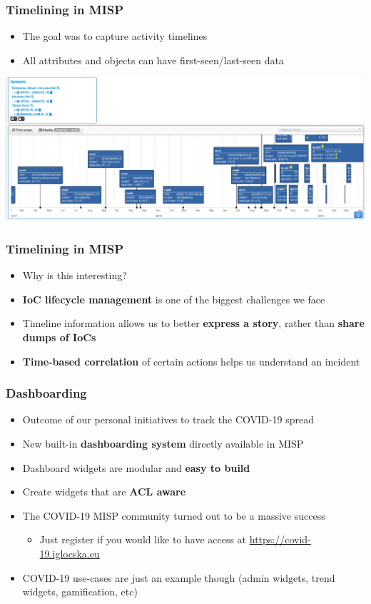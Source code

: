 \begin{frame}
\frametitle{Timelining in MISP}
\begin{itemize}
	\item The goal was to capture activity timelines
        \item All attributes and objects can have first-seen/last-seen data       
\end{itemize}
\includegraphics[scale=0.25]{images/timeline.png}
\end{frame}

\begin{frame}
\frametitle{Timelining in MISP}
\begin{itemize}
	\item Why is this interesting?
        \item {\bf IoC lifecycle management} is one of the biggest challenges we face
        \item Timeline information allows us to better {\bf express a story}, rather than {\bf share dumps of IoCs}
        \item {\bf Time-based correlation} of certain actions helps us understand an incident
\end{itemize}
\end{frame}

\begin{frame}
\frametitle{Dashboarding}
\begin{itemize}
	\item Outcome of our personal initiatives to track the COVID-19 spread
        \item New built-in {\bf dashboarding system} directly available in MISP
        \item Dashboard widgets are modular and {\bf easy to build}
        \item Create widgets that are {\bf ACL aware}
        \item The COVID-19 MISP community turned out to be a massive success
        \begin{itemize}
             \item Just register if you would like to have access at \url{https://covid-19.iglocska.eu}
        \end{itemize}
        \item COVID-19 use-cases are just an example though (admin widgets, trend widgets, gamification, etc)
\end{itemize}
\end{frame}

